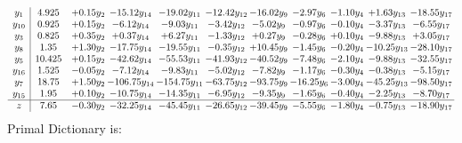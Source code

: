 \documentclass[9pt]{article}
\begin{document}
\[\begin{array}{c| c c@{\hskip 2pt} c@{\hskip 2pt} c@{\hskip 2pt} c@{\hskip 2pt} c@{\hskip 2pt} c@{\hskip 2pt} c@{\hskip 2pt} c@{\hskip 2pt} c@{\hskip 2pt} }
 y_{1}   &  4.925 & +  0.15 y_{2} & -15.12 y_{14} & -19.02 y_{11} & -12.42 y_{12} & -16.02 y_{9} & -2.97 y_{6} & -1.10 y_{4} & +  1.63 y_{13} & -18.55 y_{17}\\
 y_{10}   &  0.925 & +  0.15 y_{2} & -6.12 y_{14} & -9.03 y_{11} & -3.42 y_{12} & -5.02 y_{9} & -0.97 y_{6} & -0.10 y_{4} & -3.37 y_{13} & -6.55 y_{17}\\
 y_{3}   &  0.825 & +  0.35 y_{2} & +  0.37 y_{14} & +  6.27 y_{11} & -1.33 y_{12} & +  0.27 y_{9} & -0.28 y_{6} & +  0.10 y_{4} & -9.88 y_{13} & +  3.05 y_{17}\\
 y_{8}   &  1.35 & +  1.30 y_{2} & -17.75 y_{14} & -19.55 y_{11} & -0.35 y_{12} & + 10.45 y_{9} & -1.45 y_{6} & -0.20 y_{4} & -10.25 y_{13} & -28.10 y_{17}\\
 y_{5}   &  10.425 & +  0.15 y_{2} & -42.62 y_{14} & -55.53 y_{11} & -41.93 y_{12} & -40.52 y_{9} & -7.48 y_{6} & -2.10 y_{4} & -9.88 y_{13} & -32.55 y_{17}\\
 y_{16}   &  1.525 & -0.05 y_{2} & -7.12 y_{14} & -9.83 y_{11} & -5.02 y_{12} & -7.82 y_{9} & -1.17 y_{6} & -0.30 y_{4} & -0.38 y_{13} & -5.15 y_{17}\\
 y_{7}   &  18.75 & +  1.50 y_{2} & -106.75 y_{14} & -154.75 y_{11} & -63.75 y_{12} & -93.75 y_{9} & -16.25 y_{6} & -3.00 y_{4} & -45.25 y_{13} & -98.50 y_{17}\\
 y_{15}   &  1.95 & +  0.10 y_{2} & -10.75 y_{14} & -14.35 y_{11} & -6.95 y_{12} & -9.35 y_{9} & -1.65 y_{6} & -0.40 y_{4} & -2.25 y_{13} & -8.70 y_{17}\\
\hline
z    &  7.65 & -0.30 y_{2} & -32.25 y_{14} & -45.45 y_{11} & -26.65 y_{12} & -39.45 y_{9} & -5.55 y_{6} & -1.80 y_{4} & -0.75 y_{13} & -18.90 y_{17}\\
\end{array}\]
Primal Dictionary is:
\end{document}
